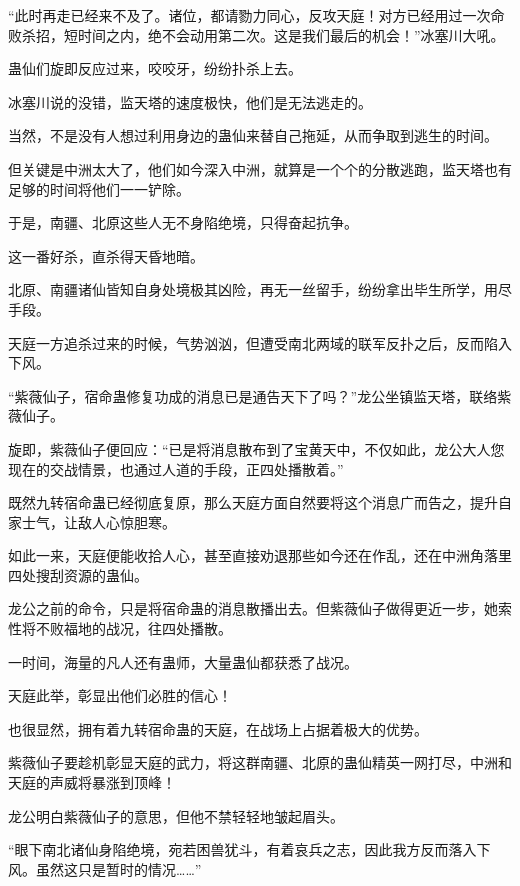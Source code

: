 
\begin{this_body}



“此时再走已经来不及了。诸位，都请勠力同心，反攻天庭！对方已经用过一次命败杀招，短时间之内，绝不会动用第二次。这是我们最后的机会！”冰塞川大吼。

蛊仙们旋即反应过来，咬咬牙，纷纷扑杀上去。

冰塞川说的没错，监天塔的速度极快，他们是无法逃走的。

当然，不是没有人想过利用身边的蛊仙来替自己拖延，从而争取到逃生的时间。

但关键是中洲太大了，他们如今深入中洲，就算是一个个的分散逃跑，监天塔也有足够的时间将他们一一铲除。

于是，南疆、北原这些人无不身陷绝境，只得奋起抗争。

这一番好杀，直杀得天昏地暗。

北原、南疆诸仙皆知自身处境极其凶险，再无一丝留手，纷纷拿出毕生所学，用尽手段。

天庭一方追杀过来的时候，气势汹汹，但遭受南北两域的联军反扑之后，反而陷入下风。

“紫薇仙子，宿命蛊修复功成的消息已是通告天下了吗？”龙公坐镇监天塔，联络紫薇仙子。

旋即，紫薇仙子便回应：“已是将消息散布到了宝黄天中，不仅如此，龙公大人您现在的交战情景，也通过人道的手段，正四处播散着。”

既然九转宿命蛊已经彻底复原，那么天庭方面自然要将这个消息广而告之，提升自家士气，让敌人心惊胆寒。

如此一来，天庭便能收拾人心，甚至直接劝退那些如今还在作乱，还在中洲角落里四处搜刮资源的蛊仙。

龙公之前的命令，只是将宿命蛊的消息散播出去。但紫薇仙子做得更近一步，她索性将不败福地的战况，往四处播散。

一时间，海量的凡人还有蛊师，大量蛊仙都获悉了战况。

天庭此举，彰显出他们必胜的信心！

也很显然，拥有着九转宿命蛊的天庭，在战场上占据着极大的优势。

紫薇仙子要趁机彰显天庭的武力，将这群南疆、北原的蛊仙精英一网打尽，中洲和天庭的声威将暴涨到顶峰！

龙公明白紫薇仙子的意思，但他不禁轻轻地皱起眉头。

“眼下南北诸仙身陷绝境，宛若困兽犹斗，有着哀兵之志，因此我方反而落入下风。虽然这只是暂时的情况……”


\end{this_body}
